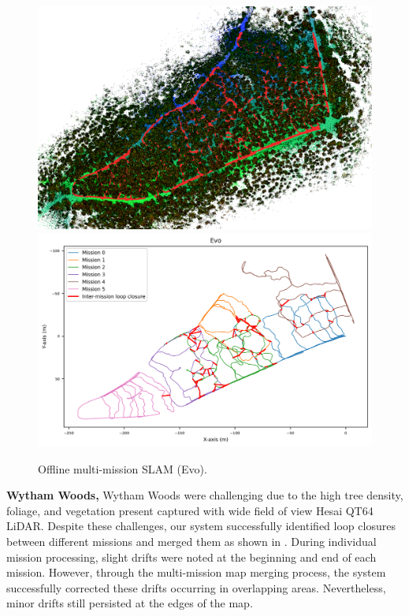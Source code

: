 \begin{figure}[htbp]
  \centering
  \includegraphics[width=\columnwidth]{pics/exp_3_offline_evo_pcd.png}
  \includegraphics[width=\columnwidth]{pics/exp_3_1_multimission_slam_evo.png}
  \caption{Offline multi-mission SLAM (Evo).}
  \label{fig:exp_multi_mission_evo}
\end{figure}
\newline
\textbf{Wytham Woods, } \hspace{0.5em}  Wytham Woods were challenging due to the high tree density, foliage, and vegetation present captured with wide field of view Hesai QT64 LiDAR. Despite these challenges, our system successfully identified loop closures between different missions and merged them as shown in . During individual mission processing, slight drifts were noted at the beginning and end of each mission. However, through the multi-mission map merging process, the system successfully corrected these drifts occurring in overlapping areas. Nevertheless, minor drifts still persisted at the edges of the map. 

